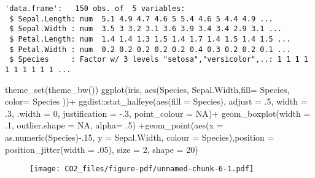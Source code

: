 \documentclass[
  letterpaper,
  DIV=11,
  numbers=noendperiod]{scrartcl}
\newenvironment{Shaded}{\begin{snugshade}}{\end{snugshade}}
\newcommand{\AttributeTok}[1]{\textcolor[rgb]{0.40,0.45,0.13}{#1}}
\newcommand{\ConstantTok}[1]{\textcolor[rgb]{0.56,0.35,0.01}{#1}}
\newcommand{\DecValTok}[1]{\textcolor[rgb]{0.68,0.00,0.00}{#1}}
\newcommand{\FunctionTok}[1]{\textcolor[rgb]{0.28,0.35,0.67}{#1}}
\newcommand{\NormalTok}[1]{\textcolor[rgb]{0.00,0.23,0.31}{#1}}
\newcommand{\SpecialCharTok}[1]{\textcolor[rgb]{0.37,0.37,0.37}{#1}}
\begin{document}
\begin{verbatim}
'data.frame':   150 obs. of  5 variables:
 $ Sepal.Length: num  5.1 4.9 4.7 4.6 5 5.4 4.6 5 4.4 4.9 ...
 $ Sepal.Width : num  3.5 3 3.2 3.1 3.6 3.9 3.4 3.4 2.9 3.1 ...
 $ Petal.Length: num  1.4 1.4 1.3 1.5 1.4 1.7 1.4 1.5 1.4 1.5 ...
 $ Petal.Width : num  0.2 0.2 0.2 0.2 0.2 0.4 0.3 0.2 0.2 0.1 ...
 $ Species     : Factor w/ 3 levels "setosa","versicolor",..: 1 1 1 1 1 1 1 1 1 1 ...
\end{verbatim}

\begin{Shaded}
\begin{Highlighting}[]
\FunctionTok{theme\_set}\NormalTok{(}\FunctionTok{theme\_bw}\NormalTok{())}
\FunctionTok{ggplot}\NormalTok{(iris, }\FunctionTok{aes}\NormalTok{(Species, Sepal.Width,}\AttributeTok{fill=}\NormalTok{ Species, }\AttributeTok{color=}\NormalTok{ Species ))}\SpecialCharTok{+} 
\NormalTok{  ggdist}\SpecialCharTok{::}\FunctionTok{stat\_halfeye}\NormalTok{(}\FunctionTok{aes}\NormalTok{(}\AttributeTok{fill =}\NormalTok{ Species), }\AttributeTok{adjust =}\NormalTok{ .}\DecValTok{5}\NormalTok{, }\AttributeTok{width =}\NormalTok{ .}\DecValTok{3}\NormalTok{,}
                       \AttributeTok{.width =} \DecValTok{0}\NormalTok{, }\AttributeTok{justification =} \SpecialCharTok{{-}}\NormalTok{.}\DecValTok{3}\NormalTok{, }\AttributeTok{point\_colour =} \ConstantTok{NA}\NormalTok{)}\SpecialCharTok{+} 
  \FunctionTok{geom\_boxplot}\NormalTok{(}\AttributeTok{width =}\NormalTok{ .}\DecValTok{1}\NormalTok{, }\AttributeTok{outlier.shape =} \ConstantTok{NA}\NormalTok{, }\AttributeTok{alpha=}\NormalTok{ .}\DecValTok{5}\NormalTok{) }\SpecialCharTok{+}\FunctionTok{geom\_point}\NormalTok{(}\FunctionTok{aes}\NormalTok{(}\AttributeTok{x =} \FunctionTok{as.numeric}\NormalTok{(Species)}\SpecialCharTok{{-}}\NormalTok{.}\DecValTok{15}\NormalTok{, }\AttributeTok{y =}\NormalTok{ Sepal.Width, }\AttributeTok{colour =}\NormalTok{ Species),}\AttributeTok{position =} \FunctionTok{position\_jitter}\NormalTok{(}\AttributeTok{width =}\NormalTok{ .}\DecValTok{05}\NormalTok{), }\AttributeTok{size =} \DecValTok{2}\NormalTok{, }\AttributeTok{shape =} \DecValTok{20}\NormalTok{)}
\end{Highlighting}
\end{Shaded}

\begin{figure}[H]

{\centering \texttt{[image: CO2\_files/figure-pdf/unnamed-chunk-6-1.pdf]}

}

\end{figure}
\end{document}
